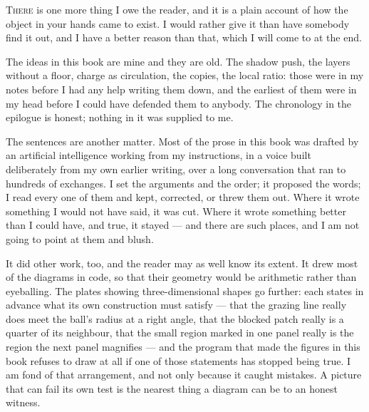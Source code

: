 
\lettrine{T}{here} is one more thing I owe the reader, and it is a plain account of how the object in your hands came to exist. I would rather give it than have somebody find it out, and I have a better reason than that, which I will come to at the end.

The ideas in this book are mine and they are old. The shadow push, the layers without a floor, charge as circulation, the copies, the local ratio: those were in my notes before I had any help writing them down, and the earliest of them were in my head before I could have defended them to anybody. The chronology in the epilogue is honest; nothing in it was supplied to me.

The sentences are another matter. Most of the prose in this book was drafted by an artificial intelligence working from my instructions, in a voice built deliberately from my own earlier writing, over a long conversation that ran to hundreds of exchanges. I set the arguments and the order; it proposed the words; I read every one of them and kept, corrected, or threw them out. Where it wrote something I would not have said, it was cut. Where it wrote something better than I could have, and true, it stayed --- and there are such places, and I am not going to point at them and blush.

It did other work, too, and the reader may as well know its extent. It drew most of the diagrams in code, so that their geometry would be arithmetic rather than eyeballing. The plates showing three-dimensional shapes go further: each states in advance what its own construction must satisfy --- that the grazing line really does meet the ball's radius at a right angle, that the blocked patch really is a quarter of its neighbour, that the small region marked in one panel really is the region the next panel magnifies --- and the program that made the figures in this book refuses to draw at all if one of those statements has stopped being true. I am fond of that arrangement, and not only because it caught mistakes. A picture that can fail its own test is the nearest thing a diagram can be to an honest witness.


